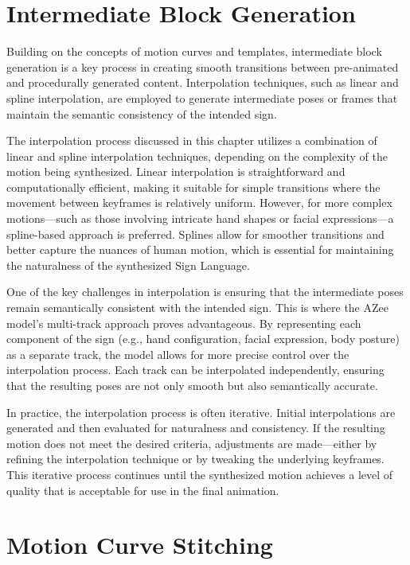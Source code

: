 \documentclass[../../main.tex]{subfiles}
\begin{document}
\section{Intermediate Block Generation}
\label{ch:intermediate_blocks:intermediate_block_generation}

Building on the concepts of motion curves and templates, intermediate block generation is a key process in creating smooth transitions between pre-animated and procedurally generated content. Interpolation techniques, such as linear and spline interpolation, are employed to generate intermediate poses or frames that maintain the semantic consistency of the intended sign.

The interpolation process discussed in this chapter utilizes a combination of linear and spline interpolation techniques, depending on the complexity of the motion being synthesized. Linear interpolation is straightforward and computationally efficient, making it suitable for simple transitions where the movement between keyframes is relatively uniform. However, for more complex motions—such as those involving intricate hand shapes or facial expressions—a spline-based approach is preferred. Splines allow for smoother transitions and better capture the nuances of human motion, which is essential for maintaining the naturalness of the synthesized Sign Language.

One of the key challenges in interpolation is ensuring that the intermediate poses remain semantically consistent with the intended sign. This is where the AZee model's multi-track approach proves advantageous. By representing each component of the sign (e.g., hand configuration, facial expression, body posture) as a separate track, the model allows for more precise control over the interpolation process. Each track can be interpolated independently, ensuring that the resulting poses are not only smooth but also semantically accurate.

In practice, the interpolation process is often iterative. Initial interpolations are generated and then evaluated for naturalness and consistency. If the resulting motion does not meet the desired criteria, adjustments are made—either by refining the interpolation technique or by tweaking the underlying keyframes. This iterative process continues until the synthesized motion achieves a level of quality that is acceptable for use in the final animation.

\section{Motion Curve Stitching}
\label{ch:intermediate_blocks:cruve_stitching}
\end{document}
